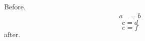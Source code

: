 \documentclass[10pt]{article}
\begin{document}
Before.
\begin{align*} a &= b \end{align*}
\begin{equation} c = d \end{equation}
\[ e = f \]
after.
\end{document}
